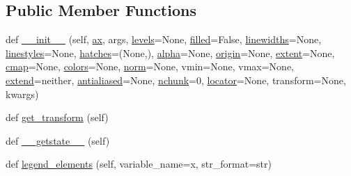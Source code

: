 \subsection*{Public Member Functions}
\begin{DoxyCompactItemize}
\item 
def \hyperlink{classmatplotlib_1_1contour_1_1ContourSet_a7388e3a3a4d5f6d25e9d2d901b255222}{\+\_\+\+\_\+init\+\_\+\+\_\+} (self, \hyperlink{classmatplotlib_1_1contour_1_1ContourSet_a3ae8b3ea504582cfb2b66cc79b932203}{ax}, args, \hyperlink{classmatplotlib_1_1contour_1_1ContourSet_aba6025f5b0fd59cbe6aac76a941897fe}{levels}=None, \hyperlink{classmatplotlib_1_1contour_1_1ContourSet_a621637634dc8faeedc071183e4acb7ab}{filled}=False, \hyperlink{classmatplotlib_1_1contour_1_1ContourSet_af20c7f687902ea9d2cc7d2534983d95e}{linewidths}=None, \hyperlink{classmatplotlib_1_1contour_1_1ContourSet_a429a0d5c9d5298e2c9cd767e5cd6eef4}{linestyles}=None, \hyperlink{classmatplotlib_1_1contour_1_1ContourSet_a02dc684807d88398c032bb3ae37ef557}{hatches}=(None,), \hyperlink{classmatplotlib_1_1contour_1_1ContourSet_aca314c8af742abe8ec5a9e2124dc2954}{alpha}=None, \hyperlink{classmatplotlib_1_1contour_1_1ContourSet_a9f52489615967eaf64936bb0b7a92c3a}{origin}=None, \hyperlink{classmatplotlib_1_1contour_1_1ContourSet_a1e727345a4c2709a0f91860d52872e76}{extent}=None, \hyperlink{classmatplotlib_1_1cm_1_1ScalarMappable_a3684ebc12a81cc6f2599c0babd1d40af}{cmap}=None, \hyperlink{classmatplotlib_1_1contour_1_1ContourSet_a9bb3cdb1062e14f66d0ad770d2c29b4c}{colors}=None, \hyperlink{classmatplotlib_1_1cm_1_1ScalarMappable_a5507985e8c38feaa3d6972f75db09f73}{norm}=None, vmin=None, vmax=None, \hyperlink{classmatplotlib_1_1contour_1_1ContourSet_a9715faa224e14112bd844981c70f89fe}{extend}=\textquotesingle{}neither\textquotesingle{}, \hyperlink{classmatplotlib_1_1contour_1_1ContourSet_aa21412e6a0351951114330a63d452ca4}{antialiased}=None, \hyperlink{classmatplotlib_1_1contour_1_1ContourSet_a1f2a94759c7bff6fdf137871db90739c}{nchunk}=0, \hyperlink{classmatplotlib_1_1contour_1_1ContourSet_a5d7222a6b1ec71d2b162c174dce699b6}{locator}=None, transform=None, kwargs)
\item 
def \hyperlink{classmatplotlib_1_1contour_1_1ContourSet_ab0f04e3c84410a49c1eee1c3e38d1f5b}{get\+\_\+transform} (self)
\item 
def \hyperlink{classmatplotlib_1_1contour_1_1ContourSet_a3f2596db08663b329359e2bb045b7cfc}{\+\_\+\+\_\+getstate\+\_\+\+\_\+} (self)
\item 
def \hyperlink{classmatplotlib_1_1contour_1_1ContourSet_a890a8c685251eca05c1b800f1301e8cf}{legend\+\_\+elements} (self, variable\+\_\+name=\textquotesingle{}x\textquotesingle{}, str\+\_\+format=str)

\end{DoxyCompactItemize}
